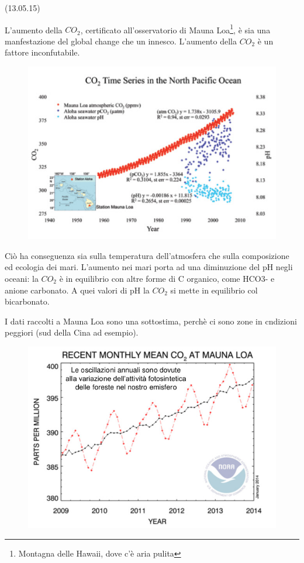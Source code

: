 \documentclass[a4paper,12pt]{book}
\begin{document}
(13.05.15)

L'aumento della $CO_{2}$, certificato all'osservatorio di Mauna Loa\footnote{Montagna delle Hawaii, dove c'è aria pulita}, è sia una manfestazione del global change che un innesco. L'aumento della $CO_{2}$ è un fattore inconfutabile.

\begin{figure}[H]
\centering
\includegraphics[scale=0.4]{immagini/CO2.jpg}
\end{figure}

Ciò ha conseguenza sia sulla temperatura dell'atmosfera che sulla composizione ed ecologia dei mari.
L'aumento nei mari porta ad una diminuzione del pH negli oceani: la $CO_{2}$ è in equilibrio con altre forme di C organico, come HCO3- e anione carbonato. A quei valori di pH la $CO_{2}$ si mette in equilibrio col bicarbonato.
 
I dati raccolti a Mauna Loa sono una sottostima, perchè ci sono zone in cndizioni peggiori (sud della Cina ad esempio).
\begin{figure}[H]
\centering
\includegraphics[scale=0.4]{immagini/mauna.jpg}
\end{figure}
\end{document}
